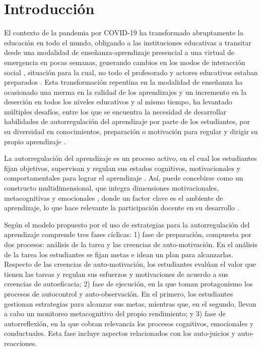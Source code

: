 \documentclass[spanish]{textolivre}
\begin{document}
\begin{polyabstract}
\begin{english}
\begin{abstract}
\end{abstract}
\end{english}

\end{polyabstract}


\section{Introducción}\label{sec-intro}
El contexto de la pandemia por COVID-19 ha transformado abruptamente la educación en todo el mundo, obligando a las instituciones educativas a transitar desde una modalidad de enseñanza-aprendizaje presencial a una virtual de emergencia en pocas semanas, generando cambios en los modos de interacción social \cite[p. 59]{gazzo2020}, situación para la cual, no todo el profesorado y actores educativos estaban preparados \cite[p. 5]{bancointeramericano2020}. Esta transformación repentina en la modalidad de enseñanza ha ocasionado una merma en la calidad de los aprendizajes y un incremento en la deserción en todos los niveles educativos \cite[p. 37]{instituto_internacional_para_la_educacion_superior_en_america_latina_y_el_caribe_covid-19_2020} y al mismo tiempo, ha levantado múltiples desafíos, entre los que se encuentra la necesidad de desarrollar habilidades de autorregulación del aprendizaje por parte de los  estudiantes, por su diversidad en conocimientos, preparación o motivación para regular y dirigir su propio aprendizaje \cite[p. 78]{marcelo2019}.

La autorregulación del aprendizaje es un proceso activo, en el cual los  estudiantes fijan objetivos, supervisan y regulan sus estados cognitivos, motivacionales y comportamentales para lograr el aprendizaje \cite[p. 140]{perez2013}. Así, puede concebirse como un constructo multidimensional, que integra dimensiones motivacionales, metacognitivas y emocionales \cite[p. 125]{gonulkurt2016}, donde un factor clave es el ambiente de aprendizaje, lo que hace relevante la participación docente en su desarrollo \cite[p. 84]{artino2012}.

Según el modelo propuesto por \textcite[p. 142]{zimmerman2013} el uso de estrategias para la autorregulación del aprendizaje comprende tres fases cíclicas: 1) fase de preparación, compuesta por dos procesos: análisis de la tarea y las creencias de auto-motivación. En el análisis de la tarea los  estudiantes se fijan metas e idean un plan para alcanzarlas. Respecto de las creencias de auto-motivación, los  estudiantes evalúan el valor que tienen las tareas y regulan sus esfuerzos y motivaciones de acuerdo a sus creencias de autoeficacia; 2) fase de ejecución, en la que toman protagonismo los procesos de autocontrol y auto-observación. En el primero, los  estudiantes gestionan estrategias para alcanzar sus metas, mientras que, en el segundo, llevan a cabo un monitoreo metacognitivo del propio rendimiento; y 3) fase de autorreflexión, en la que cobran relevancia los procesos cognitivos, emocionales y conductuales. Esta fase incluye aspectos relacionados con los auto-juicios y auto-reacciones.
\end{document}
